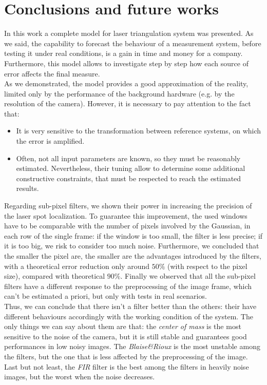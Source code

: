 \chapter{Conclusions and future works}
\label{ch:conclusions}
In this work a complete model for laser triangulation system was presented. As we said, the capability to forecast the behaviour of a measurement system, before testing it under real conditions, is a gain in time and money for a company. Furthermore, this model allows to investigate step by step how each source of error affects the final measure. \\

As we demonstrated, the model provides a good approximation of the reality, limited only by the performance of the background hardware (e.g. by the resolution of the camera). However, it is necessary to pay attention to the fact that:
  \begin{itemize}
    \item It is very sensitive to the transformation between reference systems, on which the error is amplified.
    \item Often, not all input parameters are known, so they must be reasonably estimated. 	
Nevertheless, their tuning allow to determine some additional constructive constraints, that must be respected to reach the estimated results.
  \end{itemize}
  
Regarding sub-pixel filters, we shown their power in increasing the precision of the laser spot localization. To guarantee this improvement, the used windows have to be comparable with the number of pixels involved by the Gaussian, in each row of the single frame: if the window is too small, the filter is less precise; if it is too big, we risk to consider too much noise.
Furthermore, we concluded that the smaller the pixel are, the smaller are the advantages introduced by the filters, with a theoretical error reduction only around $50\%$ (with respect to the pixel size), compared with theoretical $90\%$. Finally we observed that all the sub-pixel filters have a different response to the preprocessing of the image frame, which can't be estimated a priori, but only with tests in real scenarios. \\
Thus, we can conclude that there isn't a filter better than the others: their have different behaviours accordingly with the working condition of the system. The only things we can say about them are that: the \textit{center of mass} is the most sensitive to the noise of the camera, but it is still stable and guarantees good performances in low noisy images. The \textit{Blaise\&Rioux} is the most unstable among the filters, but the one that is less affected by the preprocessing of the image. Last but not least, the \textit{FIR} filter is the best among the filters in heavily noise images, but the worst when the noise decreases. \\

